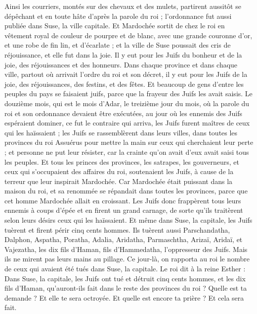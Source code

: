 \begin{multicols}{2}
Ainsi les courriers, montés sur des chevaux et des mulets, partirent aussitôt se dépêchant et en toute hâte d'après la parole du roi ; l'ordonnance fut aussi publiée dans Suse, la ville capitale.
Et Mardochée sortit de chez le roi en vêtement royal de couleur de pourpre et de blanc, avec une grande couronne d'or, et une robe de fin lin, et d'écarlate ; et la ville de Suse poussait des cris de réjouissance, et elle fut dans la joie.
Il y eut pour les Juifs du bonheur et de la joie, des réjouissances et des honneurs.
Dans chaque province et dans chaque ville, partout où arrivait l'ordre du roi et son décret, il y eut pour les Juifs de la joie, des réjouissances, des festins, et des fêtes. Et beaucoup de gens d'entre les peuples du pays se faisaient juifs, parce que la frayeur des Juifs les avait saisis.
\VerseOne{}Le douzième mois, qui est le mois d'Adar, le treizième jour du mois, où la parole du roi et son ordonnance devaient être exécutées, au jour où les ennemis des Juifs espéraient dominer, ce fut le contraire qui arriva, les Juifs furent maîtres de ceux qui les haïssaient ; 
les Juifs se rassemblèrent dans leurs villes, dans toutes les provinces du roi Assuérus pour mettre la main sur ceux qui cherchaient leur perte ; et personne ne put leur résister, car la crainte qu'on avait d'eux avait saisi tous les peuples.
Et tous les princes des provinces, les satrapes, les gouverneurs, et ceux qui s'occupaient des affaires du roi, soutenaient les Juifs, à cause de la terreur que leur inspirait Mardochée.
Car Mardochée était puissant dans la maison du roi, et sa renommée se répandait dans toutes les provinces, parce que cet homme Mardochée allait en croissant.
Les Juifs donc frappèrent tous leurs ennemis à coups d'épée et en firent un grand carnage, de sorte qu'ils traitèrent selon leurs désirs ceux qui les haïssaient.
Et même dans Suse, la capitale, les Juifs tuèrent et firent périr cinq cents hommes.
Ils tuèrent aussi Parschandatha, Dalphon, Aspatha,
Poratha, Adalia, Aridatha,
Parmaschtha, Arizaï, Aridaï, et Vajezatha,
les dix fils d'Haman, fils d'Hammedatha, l'oppresseur des Juifs. Mais ils ne mirent pas leurs mains au pillage.
Ce jour-là, on rapporta au roi le nombre de ceux qui avaient été tués dans Suse, la capitale.
Le roi dit à la reine Esther : Dans Suse, la capitale, les Juifs ont tué et détruit cinq cents hommes, et les dix fils d'Haman, qu'auront-ils fait dans le reste des provinces du roi ? Quelle est ta demande ? Et elle te sera octroyée. Et quelle est encore ta prière ? Et cela sera fait.

\end{multicols}
